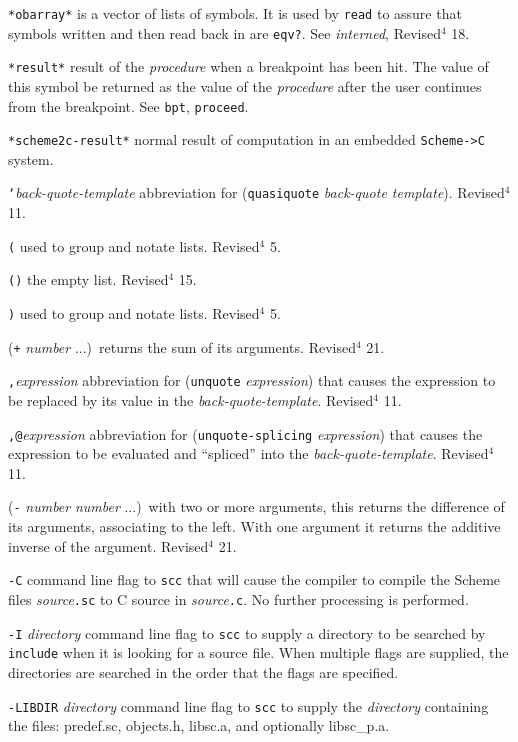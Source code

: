 \documentclass[10pt,twocolumn]{article}
\begin{document}
\texttt{*obarray*} is a vector of lists of symbols.  It is used by
\texttt{read} to assure that symbols written and then read back in are
\texttt{eqv?}.  See \emph{interned}, Revised$^4$ 18.

\texttt{*result*} result of the \emph{procedure} when a breakpoint has been
hit.  The value of this symbol be returned as the value of the
\emph{procedure} after the user continues from the breakpoint.  See
\texttt{bpt}, \texttt{proceed}.

\texttt{*scheme2c-result*} normal result of computation in an embedded
\texttt{Scheme->C} system.

\texttt{`}\emph{back-quote-template} abbreviation for (\texttt{quasiquote}
\emph{back-quote template}). Revised$^4$ 11.

\texttt{(} used to group and notate lists.  Revised$^4$ 5.

\texttt{()} the empty list.  Revised$^4$ 15.

\texttt{)} used to group and notate lists.  Revised$^4$ 5.

(\texttt{+} \emph{number} ...)\ returns the sum of its arguments.
Revised$^4$ 21.

\texttt{,}\emph{expression} abbreviation for (\texttt{unquote} \emph{expression})
that causes the expression to be replaced by its value in the
\emph{back-quote-template}.  Revised$^4$ 11.

\texttt{,@}\emph{expression} abbreviation for (\texttt{unquote-splicing}
\emph{expression}) that causes the expression to be evaluated and
``spliced'' into the \emph{back-quote-template}. Revised$^4$ 11.

(\texttt{-} \emph{number} \emph{number} ...)\ with two or more arguments, this
returns the difference of its arguments, associating to the left.
With one argument it returns the additive inverse of the argument.
Revised$^4$ 21.

\texttt{-C} command line flag to \texttt{scc} that will cause the compiler to
compile the Scheme files \emph{source}\texttt{.sc} to C source in \emph{source}\texttt{.c}.
No further processing is performed.

\texttt{-I} \emph{directory} command line flag to \texttt{scc} to supply a
directory to be searched by \texttt{include} when it is looking for a
source file.  When multiple flags are supplied, the directories are
searched in the order that the flags are specified.

\texttt{-LIBDIR} \emph{directory} command line flag to \texttt{scc} to supply the
\emph{directory} containing the files: predef.sc, objects.h, libsc.a,
and optionally libsc\_p.a.
\end{document}
